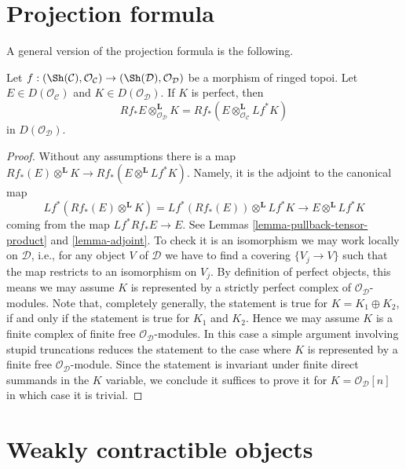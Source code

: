 \section{Projection formula}
\label{section-projection-formula}

\noindent
A general version of the projection formula is the following.

\begin{lemma}
\label{lemma-projection-formula}
Let $f : (\Sh(\mathcal{C}), \mathcal{O}_\mathcal{C}) \to
(\Sh(\mathcal{D}), \mathcal{O}_\mathcal{D})$ be a morphism of ringed topoi.
Let $E \in D(\mathcal{O}_\mathcal{C})$ and $K \in D(\mathcal{O}_\mathcal{D})$.
If $K$ is perfect, then
$$
Rf_*E \otimes^\mathbf{L}_{\mathcal{O}_\mathcal{D}} K =
Rf_*(E \otimes^\mathbf{L}_{\mathcal{O}_\mathcal{C}} Lf^*K)
$$
in $D(\mathcal{O}_\mathcal{D})$.
\end{lemma}

\begin{proof}
Without any assumptions there is a map
$Rf_*(E) \otimes^\mathbf{L} K \to Rf_*(E \otimes^\mathbf{L} Lf^*K)$.
Namely, it is the adjoint to the canonical map
$$
Lf^*(Rf_*(E) \otimes^\mathbf{L} K) = Lf^*(Rf_*(E)) \otimes^\mathbf{L} Lf^*K
\longrightarrow
E \otimes^\mathbf{L} Lf^*K
$$
coming from the map $Lf^*Rf_*E \to E$. See Lemmas
\ref{lemma-pullback-tensor-product} and \ref{lemma-adjoint}.
To check it is an isomorphism we may work locally on $\mathcal{D}$, i.e.,
for any object $V$ of $\mathcal{D}$ we have to find a covering $\{V_j \to V\}$
such that the map restricts to an isomorphism on $V_j$. By definition
of perfect objects, this means we may assume $K$ is represented by
a strictly perfect complex of $\mathcal{O}_\mathcal{D}$-modules.
Note that, completely generally, the statement is true for
$K = K_1 \oplus K_2$, if and only if the statement is true for
$K_1$ and $K_2$. Hence we may assume $K$ is a finite
complex of finite free $\mathcal{O}_\mathcal{D}$-modules.
In this case a simple argument involving stupid truncations reduces
the statement to the case where $K$ is represented by a finite
free $\mathcal{O}_\mathcal{D}$-module. Since the statement is invariant
under finite direct summands in the $K$ variable, we conclude
it suffices to prove it for $K = \mathcal{O}_\mathcal{D}[n]$
in which case it is trivial.
\end{proof}



\section{Weakly contractible objects}
\label{section-w-contractible}

